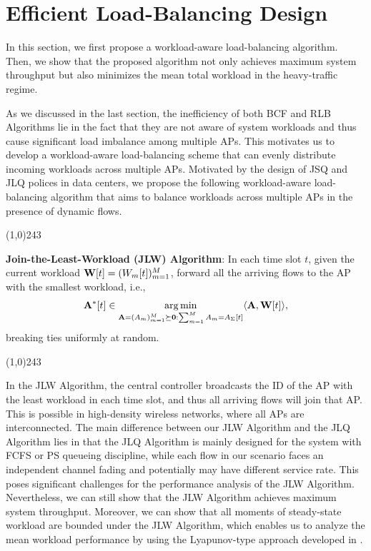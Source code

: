 \documentclass[10pt, conference, letterpaper]{IEEEtran} %
\def\argmin{\operatornamewithlimits{arg\,min}}
\begin{document}
\section{Efficient Load-Balancing Design}
\label{sec:JLW}
In this section, we first propose a workload-aware load-balancing algorithm. Then, we show that the proposed algorithm not only achieves maximum system throughput but also minimizes the mean total workload in the heavy-traffic regime.  

As we discussed in the last section, the inefficiency of both BCF and RLB Algorithms lie in the fact that they are not aware of system workloads and thus cause significant load imbalance among multiple APs. This motivates us to develop a workload-aware load-balancing scheme that can evenly distribute incoming workloads across multiple APs. Motivated by the design of JSQ and JLQ polices in data centers, we propose the following workload-aware load-balancing algorithm that aims to balance workloads across multiple APs in the presence of dynamic flows.

\noindent\line(1,0){243}

\noindent\textbf{Join-the-Least-Workload (JLW) Algorithm}: In each time slot $t$, given the current workload $\mathbf{W}[t]=(W_m[t])_{m=1}^{M}$, forward all the arriving flows to the AP with the smallest workload, i.e., 
\begin{align}
\mb{A}^{*}[t]\in\argmin_{\mb{A}=(A_m)_{m=1}^{M}\succeq\mb{0}:\sum_{m=1}^{M}A_{m}=A_{\Sigma}[t]}\langle \mb{A},\mb{W}[t]\rangle,
\end{align}
breaking ties uniformly at random.

\noindent\line(1,0){243}

In the JLW Algorithm, the central controller broadcasts the ID of the AP with the least workload in each time slot, and thus all arriving flows will join that AP. This is possible in high-density wireless networks, where all APs are interconnected. The main difference between our JLW Algorithm and the JLQ Algorithm lies in that the JLQ Algorithm is mainly designed for the system with FCFS or PS queueing discipline, while each flow in our scenario faces an independent channel fading and potentially may have different service rate. This poses significant challenges for the performance analysis of the JLW Algorithm. Nevertheless, we can still show that the JLW Algorithm achieves maximum system throughput. Moreover, we can show that all moments of steady-state workload are bounded under the JLW Algorithm, which enables us to analyze the mean workload performance by using the Lyapunov-type approach developed in \cite{erysri12}.
\end{document}
